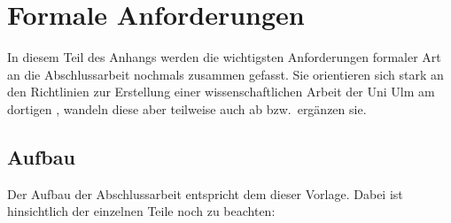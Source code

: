 \section{Formale Anforderungen}
\label{anh:Anh-Anforderungen}
%
In diesem Teil des Anhangs werden die wichtigsten Anforderungen formaler Art an die Abschlussarbeit nochmals
zusammen gefasst. Sie orientieren sich stark an den Richtlinien zur Erstellung einer wissenschaftlichen
Arbeit der Uni Ulm am dortigen  \textcite{InstitutWirtschaftswissenschaften2016}, wandeln diese aber teilweise
auch ab bzw.~ergänzen sie.
%
\subsection{Aufbau}
\label{subsec:Anh-Anforderungen-Aufbau}
%
Der Aufbau der Abschlussarbeit entspricht dem dieser Vorlage. Dabei ist hinsichtlich der einzelnen Teile noch
zu beachten:
%
